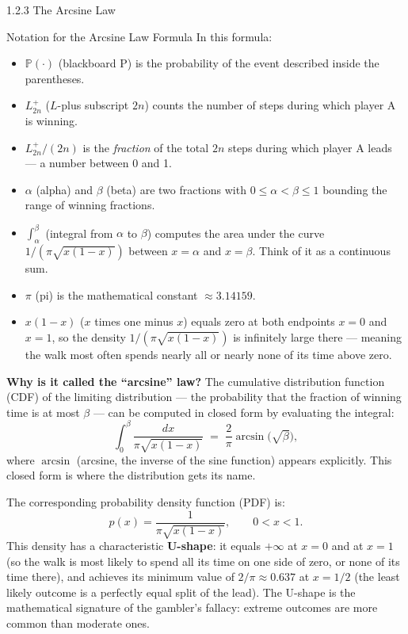 \documentclass[aspectratio=169,10pt]{beamer}
\begin{document}
\begin{frame}[allowframebreaks]{1.2.3 The Arcsine Law}
  \begin{block}{Notation for the Arcsine Law Formula}
    In this formula:
    \begin{itemize}
      \item $\mathbb{P}(\cdot)$ (blackboard P) is the probability of the event
        described inside the parentheses.
      \item $L^+_{2n}$ ($L$-plus subscript $2n$) counts the number of steps
        during which player A is winning.
      \item $L^+_{2n}/(2n)$ is the \emph{fraction} of the total $2n$ steps
        during which player A leads --- a number between 0 and 1.
      \item $\alpha$ (alpha) and $\beta$ (beta) are two fractions with
        $0 \le \alpha < \beta \le 1$ bounding the range of winning fractions.
      \item $\int_\alpha^\beta$ (integral from $\alpha$ to $\beta$) computes
        the area under the curve $1/(\pi\sqrt{x(1-x)})$ between $x = \alpha$
        and $x = \beta$.  Think of it as a continuous sum.
      \item $\pi$ (pi) is the mathematical constant $\approx 3.14159$.
      \item $x(1-x)$ ($x$ times one minus $x$) equals zero at both endpoints
        $x=0$ and $x=1$, so the density $1/(\pi\sqrt{x(1-x)})$ is infinitely
        large there --- meaning the walk most often spends nearly all or nearly
        none of its time above zero.
    \end{itemize}
  \end{block}

  \framebreak

  \textbf{Why is it called the ``arcsine'' law?}  The cumulative distribution
  function (CDF) of the limiting distribution --- the probability that the
  fraction of winning time is at most $\beta$ --- can be computed in closed
  form by evaluating the integral:
  \[
    \int_0^\beta \frac{dx}{\pi\sqrt{x(1-x)}}
    \;=\; \frac{2}{\pi}\arcsin\!\bigl(\sqrt{\beta}\bigr),
  \]
  where $\arcsin$ (arcsine, the inverse of the sine function) appears
  explicitly.  This closed form is where the distribution gets its name.

  The corresponding probability density function (PDF) is:
  \[
    p(x) = \frac{1}{\pi\sqrt{x(1-x)}}, \qquad 0 < x < 1.
  \]
  This density has a characteristic \textbf{U-shape}: it equals $+\infty$ at
  $x = 0$ and at $x = 1$ (so the walk is most likely to spend all its time on
  one side of zero, or none of its time there), and achieves its minimum value
  of $2/\pi \approx 0.637$ at $x = 1/2$ (the least likely outcome is a
  perfectly equal split of the lead).  The U-shape is the mathematical
  signature of the gambler's fallacy: extreme outcomes are more common than
  moderate ones.


\end{frame}
\end{document}
